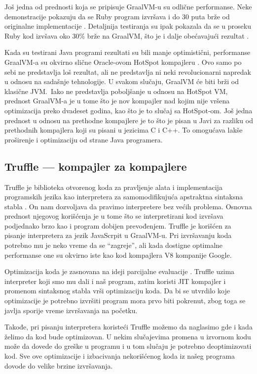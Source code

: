 \documentclass[a4paper]{article}
\begin{document}
Još jedna od prednosti koja se pripisuje GraalVM-u su odlične performanse. Neke demonstracije pokazuju da se Ruby program izvršava i do 30 puta brže od originalne implementacije \cite{graalvm}. Detaljnija testiranja su ipak pokazala da se u proseku Ruby kod izvšava oko 30\% brže na GraalVM, što je i dalje obećavajući rezultat \cite{graalvm}.

Kada su testirani Java programi rezultati su bili manje optimistični, performanse GraalVM-a su okvirno slične Oracle-ovom HotSpot kompajleru \cite{graalvm}. Ovo samo po sebi ne predstavlja loš rezultat, ali ne predstavlja ni neki revolucionarni napredak u odnosu na sadašnje tehnologije. U svakom slučaju, GraalVM će biti brži od klasične JVM.\ Iako ne predstavlja poboljšanje u odnosu na HotSpot VM, prednost GraalVM-a je u tome što je nov kompajler nad kojim nije vršena optimizacija preko dvadeset godina, kao što je to slučaj sa HotSpot-om. Još jedna prednost u odnosu na prethodne kompajlere je to što je pisan u Javi za razliku od prethodnih kompajlera koji su pisani u jezicima C i C++. To omogućava lakše proširenje i optimizaciju od strane Java programera.

\subsection{Truffle --- kompajler za kompajlere}
\label{sub:truffle}

Truffle je biblioteka otvorenog koda za pravljenje alata i implementacija programskih jezika kao interpretera za samomodifikujuća apstraktna sintaksna stabla \cite{graalvm}. On nam dozvoljava da pravimo interpretere bez većih problema. Osnovna prednost njegovog korišćenja je u tome što se interpretirani kod izvršava podjednako brzo kao i program dobijen prevođenjem. Truffle je korišćen za pisanje interpretera za jezik JavaScrpit u GraalVM-u. Pri izvršavanju koda potrebno mu je neko vreme da se ``zagreje'', ali kada dostigne optimalne performanse one su okvirno iste kao kod kompajlera V8 kompanije Google.

Optimizacija koda je zasnovana na ideji parcijalne evaluacije \cite{graalvm}. Truffle uzima interpreter koji smo mu dali i naš program, zatim koristi JIT kompajler i promenom sintaksnog stabla vrši optimizaciju koda. Da bi se utvrdilo koje optimizacije je potrebno izvršiti program mora prvo biti pokrenut, zbog toga se javlja sporije vreme izvršavanja na početku.

Takođe, pri pisanju interpretera koristeći Truffle možemo da naglasimo gde i kada želimo da kod bude optimizovan. U nekim slučajevima promena u izvornom kodu može da dovede do greške u programu i u tom slučaju je potrebno deoptimizovati kod. Sve ove optimizacije i izbacivanja nekorišćenog koda iz našeg programa dovode do velike brzine izvršavanja.
\end{document}
